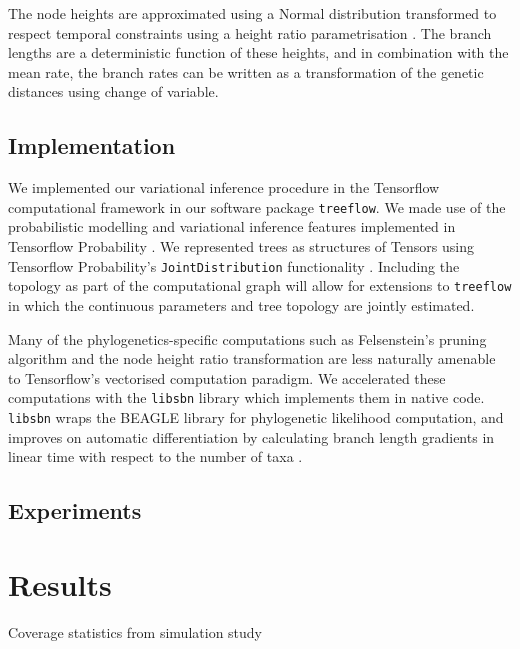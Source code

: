 The node heights are approximated using a Normal distribution transformed to respect temporal constraints using a height ratio parametrisation \cite{fourment2019evaluating}. The branch lengths are a deterministic function of these heights, and in combination with the mean rate, the branch rates can be written as a transformation of the genetic distances using change of variable.


\subsection*{Implementation}

We implemented our variational inference procedure in the Tensorflow computational framework \cite{abadi2016tensorflow} in our software package \texttt{treeflow}. %
We made use of the probabilistic modelling and variational inference features implemented in Tensorflow Probability \cite{dillon2017tensorflow}. We represented trees as structures of Tensors using Tensorflow Probability's \texttt{JointDistribution} functionality \cite{piponi2020joint}. Including the topology as part of the computational graph will allow for extensions to \texttt{treeflow} in which the continuous parameters and tree topology are jointly estimated.

Many of the phylogenetics-specific computations such as Felsenstein's pruning algorithm and the node height ratio transformation are less naturally amenable to Tensorflow's vectorised computation paradigm. We accelerated these computations with the \texttt{libsbn} library \cite{zhang2018generalizing} which implements them in native code. \texttt{libsbn} wraps the BEAGLE library \cite{ayres2019beagle} for phylogenetic likelihood computation, and improves on automatic differentiation by calculating branch length gradients in linear time with respect to the number of taxa \cite{ji2020gradients}.

\subsection*{Experiments}

\section*{Results}

\begin{table}
    \centering
    \caption{Coverage statistics from simulation study}
    \label{tab:coverage}
\end{table}


